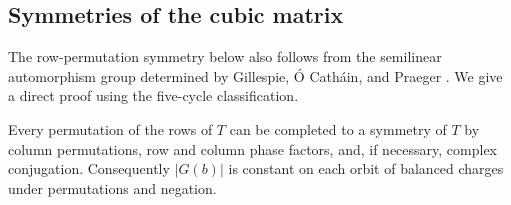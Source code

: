 \subsection{Symmetries of the cubic matrix}

The row-permutation symmetry below also follows from the semilinear
automorphism group determined by Gillespie, \'O Cath\'ain, and Praeger
\cite[Proposition~2]{GillespieOCathainPraeger2018}. We give a direct
proof using the five-cycle classification.

\begin{lemma}\label{lem:cubic-symmetry}
Every permutation of the rows of $T$ can be completed to a symmetry
of $T$ by column permutations, row and column phase factors, and,
if necessary, complex conjugation. Consequently $|G(b)|$ is constant
on each orbit of balanced charges under permutations and negation.
\end{lemma}

